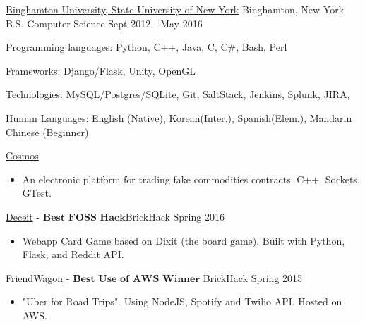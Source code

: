 \documentclass[11pt]{article}
\begin{document}
\spacedhrule{0.1em}{0.5em}  %

\headedsection
{\href{http://www.binghamton.edu/index.php}{Binghamton University, State University of New York}}
{Binghamton, New York} {
    \inlineheadrightdate
    {B.S. Computer Science}
    {Sept 2012 - May 2016}
    {}
}

\nobreakvspace{0.5em}  %


\spacedhrule{0.1em}{0.5em}  %

\inlineskillsection  %
{Programming languages:}
{ Python, C++, Java, C, C\#, Bash, Perl }

\inlineskillsection  
{Frameworks:}
{ Django/Flask, Unity, OpenGL}

\inlineskillsection
{Technologies:}
{ MySQL/Postgres/SQLite, Git, SaltStack, Jenkins, Splunk, JIRA, \latex }

\inlineskillsection
{Human Languages:}
{English (Native), Korean(Inter.), Spanish(Elem.), Mandarin Chinese (Beginner)}


\nobreakvspace{0.3em}  %


\spacedhrule{0.1em}{0.5em}  %

\projects
{{\href{https://github.com/gabeochoa/Cosmos}{Cosmos}}}{}
{
    \begin{itemize}[label={}]
        \setlength\itemsep{.005ex}
        \item{An electronic platform for trading fake commodities contracts. C++, Sockets, GTest.}
    \end{itemize}
}

\projects
{{\href{https://github.com/gabeochoa/sokim}{Deceit}} - $\textbf{Best FOSS Hack}$}{BrickHack Spring 2016}
{
    \begin{itemize}[label={}]
        \setlength\itemsep{.005ex}
        \item{Webapp Card Game based on Dixit (the board game). Built with Python, Flask, and Reddit API.}
    \end{itemize}
}

\headedsubsection
{{\href{https://github.com/alanplotko/RoadTrip}{FriendWagon}} - $\textbf{Best Use of AWS Winner}$ }
{BrickHack Spring 2015}
{
    \begin{itemize}[label={}]
    	\setlength\itemsep{.005ex}
        \item{"Uber for Road Trips". Using NodeJS, Spotify and Twilio API. Hosted on AWS.}
    \end{itemize}
}
\end{document}
